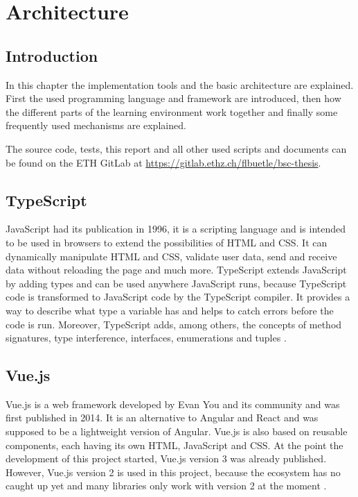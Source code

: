 \chapter{Architecture}
\label{chapter:architecture}

\section{Introduction}
\label{section:introduction}
In this chapter the implementation tools and the basic architecture are explained. First the used programming language and framework are introduced, then how the different parts of the learning environment work together and finally some frequently used mechanisms are explained.

The source code, tests, this report and all other used scripts and documents can be found on the ETH GitLab at \url{https://gitlab.ethz.ch/flbuetle/bsc-thesis}.

\section{TypeScript}
\label{section:typescript}
JavaScript had its publication in 1996, it is a scripting language and is intended to be used in browsers to extend the possibilities of HTML and CSS. It can dynamically manipulate HTML and CSS, validate user data, send and receive data without reloading the page and much more.
TypeScript extends JavaScript by adding types and can be used anywhere JavaScript runs, because TypeScript code is transformed to JavaScript code by the TypeScript compiler. It provides a way to describe what type a variable has and helps to catch errors before the code is run. Moreover, TypeScript adds, among others, the concepts of method signatures, type interference, interfaces, enumerations and tuples \cite{Typescript}.

\section{Vue.js}
\label{section:vuejs}
Vue.js is a web framework developed by Evan You and its community and was first published in 2014. It is an alternative to Angular and React and was supposed to be a lightweight version of Angular. Vue.js is also based on reusable components, each having its own HTML, JavaScript and CSS.
At the point the development of this project started, Vue.js version 3 was already published. However, Vue.js version 2 is used in this project, because the ecosystem has no caught up yet and many libraries only work with version 2 at the moment \cite{Vue}.

